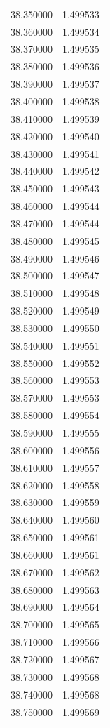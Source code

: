 \begin{tabular}{rr}
38.350000 & 1.499533 \\
38.360000 & 1.499534 \\
38.370000 & 1.499535 \\
38.380000 & 1.499536 \\
38.390000 & 1.499537 \\
38.400000 & 1.499538 \\
38.410000 & 1.499539 \\
38.420000 & 1.499540 \\
38.430000 & 1.499541 \\
38.440000 & 1.499542 \\
38.450000 & 1.499543 \\
38.460000 & 1.499544 \\
38.470000 & 1.499544 \\
38.480000 & 1.499545 \\
38.490000 & 1.499546 \\
38.500000 & 1.499547 \\
38.510000 & 1.499548 \\
38.520000 & 1.499549 \\
38.530000 & 1.499550 \\
38.540000 & 1.499551 \\
38.550000 & 1.499552 \\
38.560000 & 1.499553 \\
38.570000 & 1.499553 \\
38.580000 & 1.499554 \\
38.590000 & 1.499555 \\
38.600000 & 1.499556 \\
38.610000 & 1.499557 \\
38.620000 & 1.499558 \\
38.630000 & 1.499559 \\
38.640000 & 1.499560 \\
38.650000 & 1.499561 \\
38.660000 & 1.499561 \\
38.670000 & 1.499562 \\
38.680000 & 1.499563 \\
38.690000 & 1.499564 \\
38.700000 & 1.499565 \\
38.710000 & 1.499566 \\
38.720000 & 1.499567 \\
38.730000 & 1.499568 \\
38.740000 & 1.499568 \\
38.750000 & 1.499569 \\

\end{tabular}
